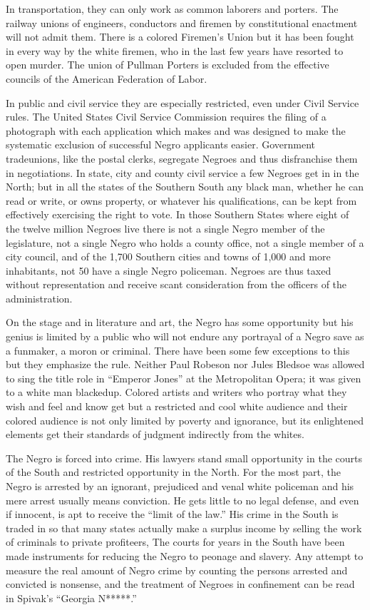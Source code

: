 \documentclass[letterpaper,10pt,english]{jupyterBook}
\begin{document}
\sphinxAtStartPar
In transportation, they can only work as common laborers and porters. The railway unions of engineers, conductors and firemen by constitutional enactment will not admit them. There is a colored Firemen’s Union but it has been fought in every way by the white firemen, who in the last few years have resorted to open murder. The union of Pullman Porters is excluded from the effective councils of the American Federation of Labor.

\sphinxAtStartPar
In public and civil service they are especially restricted, even under Civil Service rules. The United States Civil Service Commission requires the filing of a photograph with each application which makes and was designed to make the systematic exclusion of successful Negro applicants easier. Government trade\sphinxhyphen{}unions, like the postal clerks, segregate Negroes and thus disfranchise them in negotiations. In state, city and county civil service a few Negroes get in in the North; but in all the states of the Southern South any black man, whether he can read or write, or owns property, or whatever his qualifications, can be kept from effectively exercising the right to vote. In those Southern States where eight of the twelve million Negroes live there is not a single Negro member of the legislature, not a single Negro who holds a county office, not a single member of a city council, and of the 1,700 Southern cities and towns of 1,000 and more inhabitants, not 50 have a single Negro policeman. Negroes are thus taxed without representation and receive scant consideration from the officers of the administration.

\sphinxAtStartPar
On the stage and in literature and art, the Negro has some opportunity but his genius is limited by a public who will not endure any portrayal of a Negro save as a fun\sphinxhyphen{}maker, a moron or criminal. There have been some few exceptions to this but they emphasize the rule. Neither Paul Robeson nor Jules Bledsoe was allowed to sing the title role in “Emperor Jones” at the Metropolitan Opera; it was given to a white man blacked\sphinxhyphen{}up. Colored artists and writers who portray what they wish and feel and know get but a restricted and cool white audience and their colored audience is not only limited by poverty and ignorance, but its enlightened elements get their standards of judgment indirectly from the whites.

\sphinxAtStartPar
The Negro is forced into crime. His lawyers stand small opportunity in the courts of the South and restricted opportunity in the North. For the most part, the Negro is arrested by an ignorant, prejudiced and venal white policeman and his mere arrest usually means conviction. He gets little to no legal defense, and even if innocent, is apt to receive the “limit of the law.” His crime in the South is traded in so that many states actually make a surplus income by selling the work of criminals to private profiteers, The courts for years in the South have been made instruments for reducing the Negro to peonage and slavery. Any attempt to measure the real amount of Negro crime by counting the persons arrested and convicted is nonsense, and the treatment of Negroes in confinement can be read in Spivak’s “Georgia N*****.”
\end{document}
